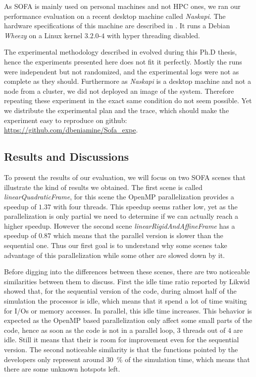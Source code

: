 As \gls{SOFA} is mainly used on personal machines and not \gls{HPC} ones, we ran our performance evaluation on a recent desktop machine called \emph{Naskapi}.
The hardware specifications of this machine are described in .
It runs a \gls{Debian} \emph{Wheezy} on a Linux kernel $3.2.0$-$4$ with hyper threading disabled.


The experimental methodology described in  evolved during this Ph.D thesis, hence the experiments presented here does not fit it perfectly.
Mostly the runs were independent but not randomized, and the experimental logs were not as complete as they should.
Furthermore as \emph{Naskapi} is a desktop machine and not a node from a cluster, we did not deployed an image of the system.
Therefore repeating these experiment in the exact same condition do not seem possible.
Yet we distribute the experimental plan and the trace, which should make the experiment easy to reproduce on github: \url{https://github.com/dbeniamine/Sofa\_expe}.


\subsection{Results and Discussions}

To present the results of our evaluation, we will focus on two \gls{SOFA} scenes that illustrate the kind of results we obtained.
The first scene is called \emph{linearQuadraticFrame}, for this scene the \gls{OpenMP} parallelization provides a speedup of $1.37$ with four threads.
This speedup seems rather low, yet as the parallelization is only partial we need to determine if we can actually reach a higher speedup.
However the second scene \emph{linearRigidAndAffineFrame} has a speedup of $0.87$ which means that the parallel version is slower than the sequential one.
Thus our first goal is to understand why some scenes take advantage of this parallelization while some other are slowed down by it.

Before digging into the differences between these scenes, there are two noticeable similarities between them to discuss.
First the idle time ratio reported by \gls{Likwid} showed that, for the sequential version of the code, during almost half of the simulation the processor is idle, which means that it spend a lot of time waiting for \glspl{I/O} or memory accesses.
In parallel,  this idle time increases.
This behavior is expected as the \gls{OpenMP} based parallelization only affect some small parts of the code, hence as soon as the code is not in a parallel loop, $3$ threads out of $4$ are idle.
Still it means that their is room for improvement even for the sequential version.
The second noticeable similarity is that the functions pointed by the developers only represent around \SI{30}{\%} of the simulation time, which means that there are some unknown hotspots left.

